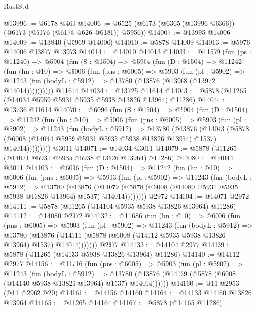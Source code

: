 \begin{lexlean}{RustStd}
\begin{coremodule}
@13996 := @6178 @460
@14006 := @6525 (@6173 (@6365 (@13996 @6366)) (@6173 (@6176 (@6178 @626 @6181)) @5956))
@14007 := @13995 @14006
@14009 := @13840 (@5969 @14006)
@14010 := @5878 @14009
@14013 := @5976 @14006 @13877 @13973
@14014 := @14010 @14013
@14033 := @11579
    (fun (ps : @11240) =>
    @5904
      (fun (S : @1504) =>
      @5904
        (fun (D : @1504) =>
        @11242
          (fun (hn : @10) =>
          @6006
            (fun (pns : @6005) =>
            @5903
              (fun (pl : @5902) =>
              @11243 (fun (bodyL : @5912) => @13780 (@13876 (@13968 (@13972 @14014))))))))))
    @11614
@14034 := @13725 @11614
@14043 := @5878 (@11265 (@14034 @5959 @5931 @5935 @5938 @13826 @13964) @11286)
@14044 := @13736 @11614
@14070 := @6096
    (fun (S : @1504) =>
    @5904
      (fun (D : @1504) =>
      @11242
        (fun (hn : @10) =>
        @6006
          (fun (pns : @6005) =>
          @5903
            (fun (pl : @5902) =>
            @11243
              (fun (bodyL : @5912) =>
              @13780
                (@13876
                  (@14043
                    (@5878
                      (@6008 (@14044 @5959 @5931 @5935 @5938 @13826 @13964) @1537)
                      @14014)))))))))
    @3011
@14071 := @14034 @3011
@14079 := @5878 (@11265 (@14071 @5931 @5935 @5938 @13826 @13964) @11286)
@14080 := @14044 @3011
@14103 := @6096
    (fun (D : @1504) =>
    @11242
      (fun (hn : @10) =>
      @6006
        (fun (pns : @6005) =>
        @5903
          (fun (pl : @5902) =>
          @11243
            (fun (bodyL : @5912) =>
            @13780
              (@13876
                (@14079 (@5878 (@6008 (@14080 @5931 @5935 @5938 @13826 @13964) @1537) @14014))))))))
    @2972
@14104 := @14071 @2972
@14111 := @5878 (@11265 (@14104 @5935 @5938 @13826 @13964) @11286)
@14112 := @14080 @2972
@14132 := @11686
    (fun (hn : @10) =>
    @6006
      (fun (pns : @6005) =>
      @5903
        (fun (pl : @5902) =>
        @11243
          (fun (bodyL : @5912) =>
          @13780
            (@13876 (@14111 (@5878 (@6008 (@14112 @5935 @5938 @13826 @13964) @1537) @14014)))))))
    @2977
@14133 := @14104 @2977
@14139 := @5878 (@11265 (@14133 @5938 @13826 @13964) @11286)
@14140 := @14112 @2977
@14156 := @11716
    (fun (pns : @6005) =>
    @5903
      (fun (pl : @5902) =>
      @11243
        (fun (bodyL : @5912) =>
        @13780 (@13876 (@14139 (@5878 (@6008 (@14140 @5938 @13826 @13964) @1537) @14014))))))
@14160 := @11 @2953 (@11 @2962 @20)
@14161 := @14156 @14160
@14164 := @14133 @14160 @13826 @13964
@14165 := @11265 @14164
@14167 := @5878 (@14165 @11286)

\end{coremodule}
\end{lexlean}
